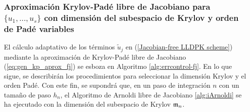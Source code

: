 \subsubsection{Aproximación Krylov-Padé libre de Jacobiano para $\{ u_1,\ldots, u_s \}$ con dimensión del subespacio de Krylov y orden de Padé variables}

El cálculo adaptativo de los términos $\widetilde{u}_j$ en (\ref{Jacobian-free LLDPK scheme}) mediante la aproximación de Krylov-Padé libre de Jacobiano (\ref{eq:gen_kp_aprox_fj}) se esboza en Algoritmo \ref{alg:errcontrol-fj}. En lo que sigue, se describirán los procedimientos para seleccionar la dimensión Krylov y el orden Padé. Con este fin, se supondrá que, en un paso de integración $n$ con un tamaño de paso $h_n$, el Algoritmo de Arnoldi libre de Jacobiano \ref{alg:iArnoldi} se ha ejecutado con la dimensión del subespacio de Krylov $\mathfrak{m}_n$.

